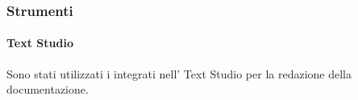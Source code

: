 



        \subsubsection{Strumenti}
            \paragraph{Text Studio}
            	Sono stati utilizzati i  integrati nell' Text Studio per la redazione della documentazione.